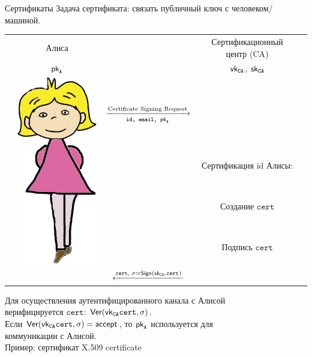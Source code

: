 \documentclass[usenames,dvipsnames,8pt,aspectratio=169]{beamer}
\begin{document}
\begin{frame}{Сертификаты}
\Large 
Задача сертификата:  связать публичный ключ с человеком/машиной.
\begin{center}
\begin{tabular}{l c c c l}
& \Large Алиса & &\Large Сертификационный центр (CA)&  \\ 
&  $\textsf{pk}_{\texttt{A}}$  & & $\textsf{vk}_{\texttt{CA}}$, $\textsf{sk}_{\texttt{CA}}$ & \\
& \multirow{5}{*}{\includegraphics[scale=0.15]{Alice}} & & &  \\  \pause
& & $\xrightarrow[\texttt{id, email, } \textsf{pk}_{\texttt{A}}]{\text {Certificate Signing Request}}$ & & \\  \pause
& & & \Large Сертификация id Алисы: & \\
& & & Создание $\texttt{cert}$& \\
& & & Подпись $\texttt{cert}$& \\
& & $\xleftarrow{\LARGE \texttt{cert}, \; \sigma = \Sign(\sk_{\texttt{CA}}, \texttt{cert})}$ & & \\  
\end{tabular}
\end{center}

\vspace{15pt}
\Large
Для осуществления аутентифицированного канала с Алисой \\
верифицируется $\texttt{cert}$:
$\textsf{Ver}(\textsf{vk}_{\texttt{CA}} \texttt{cert},\sigma )$. \\[5pt]

Если $\textsf{Ver}(\textsf{vk}_{\texttt{CA}} \texttt{cert},\sigma ) = \mathsf{accept}$, то $\textsf{pk}_{\texttt{A}}$ используется для \\ коммуникации с Алисой.\\[8pt]

Пример: сертификат X.509 certificate
\end{frame}
\end{document}
